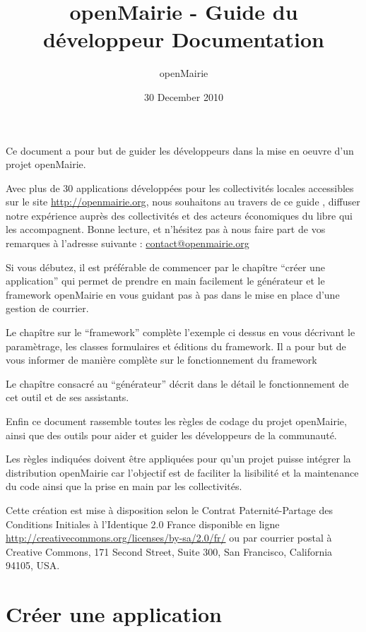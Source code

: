 \documentclass[letterpaper,10pt,french]{manual}
\title{openMairie - Guide du développeur Documentation}
\date{30 December 2010}
\author{openMairie}
\begin{document}
\maketitle
\tableofcontents



Ce document a pour but de guider les développeurs dans la mise en oeuvre
d'un projet openMairie.

Avec plus de 30 applications développées pour les collectivités locales accessibles
sur le site \href{http://openmairie.org}{http://openmairie.org}, nous souhaitons au travers de ce guide , diffuser notre
expérience auprès  des collectivités et des acteurs économiques du libre qui les accompagnent.
Bonne lecture, et n'hésitez pas à nous faire part de vos remarques à l'adresse suivante :
\href{mailto:contact@openmairie.org}{contact@openmairie.org}

Si vous débutez, il est préférable de commencer par le chapître
``créer une application'' qui permet de prendre en main facilement le générateur et le
framework openMairie en vous guidant pas à pas dans le mise en place d'une
gestion de courrier.

Le chapître sur le ``framework'' complète l'exemple ci dessus en vous décrivant
le paramètrage, les classes formulaires et éditions du framework. Il a pour but
de vous informer de manière complète sur le fonctionnement du framework

Le chapître consacré au ``générateur'' décrit dans le détail le fonctionnement
de cet outil et de ses assistants.

Enfin ce document rassemble toutes les règles de codage du projet
openMairie, ainsi que des outils pour aider et guider les développeurs de la
communauté.

Les règles indiquées doivent être appliquées pour qu'un projet puisse
intégrer la distribution openMairie car l'objectif est de faciliter la
lisibilité et la maintenance du code ainsi que la prise en main par les
collectivités.

Cette création est mise à disposition selon le Contrat Paternité-Partage des
Conditions Initiales à l'Identique 2.0 France disponible en ligne
\href{http://creativecommons.org/licenses/by-sa/2.0/fr/}{http://creativecommons.org/licenses/by-sa/2.0/fr/} ou par courrier postal à
Creative Commons, 171 Second Street, Suite 300, San Francisco,
California 94105, USA.


\chapter{Créer une application}
\end{document}
